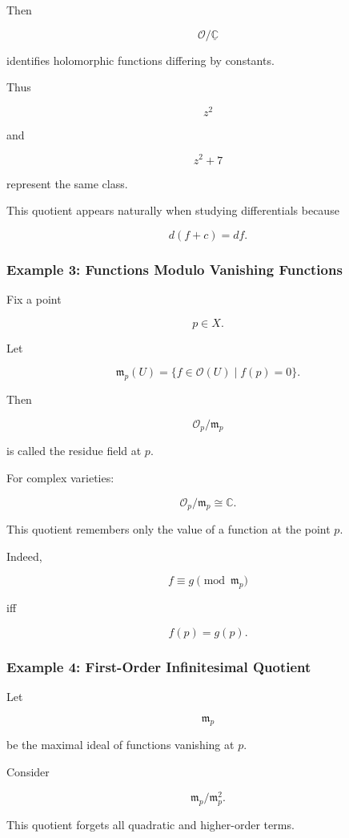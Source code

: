 \documentclass[12pt,a4paper]{article}
\theoremstyle{notespace}
\begin{document}
Then

\[
\mathcal O/\underline{\mathbb C}
\]

identifies holomorphic functions differing by constants.

Thus

\[
z^2
\]

and

\[
z^2+7
\]

represent the same class.

This quotient appears naturally when studying differentials because

\[
d(f+c)=df.
\]

\bigskip

\subsubsection*{Example 3: Functions Modulo Vanishing Functions}

Fix a point

\[
p\in X.
\]

Let

\[
\mathfrak m_p(U)
=
\{f\in\mathcal O(U)\mid f(p)=0\}.
\]

Then

\[
\mathcal O_p/\mathfrak m_p
\]

is called the residue field at \(p\).

For complex varieties:

\[
\mathcal O_p/\mathfrak m_p
\cong
\mathbb C.
\]

This quotient remembers only the value of a function at the point \(p\).

Indeed,

\[
f
\equiv
g
\pmod{\mathfrak m_p}
\]

iff

\[
f(p)=g(p).
\]

\bigskip

\subsubsection*{Example 4: First-Order Infinitesimal Quotient}

Let

\[
\mathfrak m_p
\]

be the maximal ideal of functions vanishing at \(p\).

Consider

\[
\mathfrak m_p/\mathfrak m_p^2.
\]

This quotient forgets all quadratic and higher-order terms.
\end{document}
